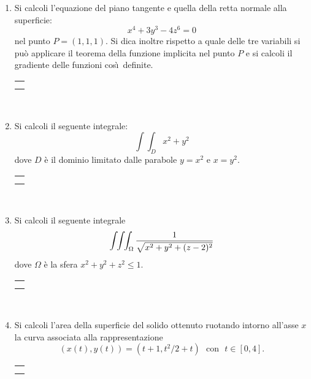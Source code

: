 \documentclass[12pt,a4paper]{report}\pagenumbering{roman}
\begin{document}
\begin{enumerate}
\item Si calcoli l'equazione del piano tangente e quella della retta normale alla
superficie:
$$x^4+3y^3-4z^6=0$$
nel punto $P=(1,1,1)$. Si dica inoltre rispetto a quale delle tre variabili
si pu\`o applicare il teorema della funzione implicita nel punto $P$ e si calcoli
il gradiente delle funzioni cos\`\i\ definite.

\hspace*{-3.5cm}\begin{tabular}{c}\hline\\\hspace*{16cm}\end{tabular}\\
\hspace*{-3.5cm}{\bf SVOLGIMENTO:}\pagebreak 

\item Si calcoli il seguente integrale:
$$\int\!\!\int_{D}x^2+y^2$$
dove $D$ \`e il dominio limitato dalle parabole $y=x^2$ e $x=y^2$.

\hspace*{-3.5cm}\begin{tabular}{c}\hline\\\hspace*{16cm}\end{tabular}\\
\hspace*{-3.5cm}{\bf SVOLGIMENTO:}\pagebreak

\item Si calcoli il seguente integrale 
$$\int\!\!\int\!\!\int_{\Omega} {1\over \sqrt{x^2+y^2+(z-2)^2}}$$
dove $\Omega$ \`e la sfera $x^2+y^2+z^2\leq1$.

\hspace*{-3.5cm}\begin{tabular}{c}\hline\\\hspace*{16cm}\end{tabular}\\
\hspace*{-3.5cm}{\bf SVOLGIMENTO:}\pagebreak

\item Si calcoli l'area della superficie del solido ottenuto ruotando
intorno all'asse $x$ la curva associata alla rappresentazione 
$$(x(t),y(t))=(t+1,t^2/2+t)\ \ \ \mbox{con}\ \ \ t\in[0,4].$$

\hspace*{-3.5cm}\begin{tabular}{c}\hline\\\hspace*{16cm}\end{tabular}\\
\hspace*{-3.5cm}{\bf SVOLGIMENTO:}\pagebreak


\end{enumerate}
\end{document}
